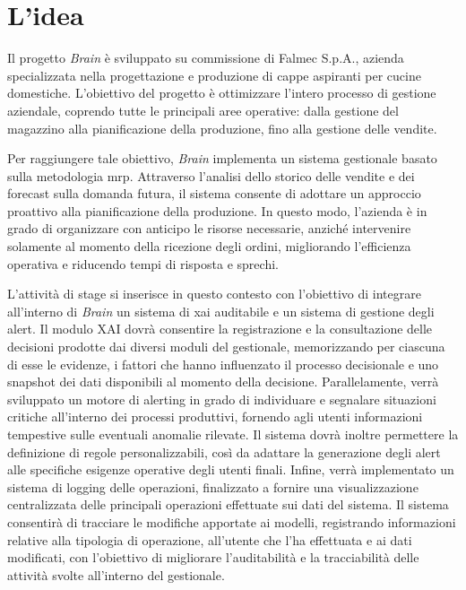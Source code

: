 \section{L'idea}
Il progetto \textit{Brain} è sviluppato su commissione di Falmec S.p.A., azienda 
specializzata nella progettazione e produzione di cappe aspiranti per cucine domestiche. 
L'obiettivo del progetto è ottimizzare l'intero processo di gestione aziendale, coprendo 
tutte le principali aree operative: dalla gestione del magazzino alla pianificazione della 
produzione, fino alla gestione delle vendite.

Per raggiungere tale obiettivo, \textit{Brain} implementa un sistema gestionale basato sulla 
metodologia \acrfull{mrp}. Attraverso l'analisi dello storico 
delle vendite e dei \gls{forecast} sulla domanda futura, il sistema 
consente di adottare un approccio proattivo alla pianificazione della produzione. In questo 
modo, l'azienda è in grado di organizzare con anticipo le risorse necessarie, anziché 
intervenire solamente al momento della ricezione degli ordini, migliorando l'efficienza 
operativa e riducendo tempi di risposta e sprechi.

L'attività di stage si inserisce in questo contesto con l'obiettivo di integrare all'interno di \textit{Brain} un sistema di \acrfull{xai} auditabile e un sistema di gestione 
degli alert.
\newline
Il modulo XAI dovrà consentire la registrazione e la consultazione delle decisioni prodotte dai diversi moduli del gestionale, memorizzando per ciascuna di esse le evidenze, 
i fattori che hanno influenzato il processo decisionale e uno \gls{snapshot} dei dati disponibili al momento della decisione.
\newline
Parallelamente, verrà sviluppato un motore di alerting in grado di individuare e segnalare situazioni critiche all'interno dei processi produttivi, fornendo agli utenti 
informazioni tempestive sulle eventuali anomalie rilevate. Il sistema dovrà inoltre permettere la definizione di regole personalizzabili, così da adattare la generazione degli
alert alle specifiche esigenze operative degli utenti finali.
\newline 
Infine, verrà implementato un sistema di logging delle operazioni, finalizzato a fornire una visualizzazione centralizzata delle principali operazioni effettuate sui dati 
del sistema. Il sistema consentirà di tracciare le modifiche apportate ai modelli, registrando informazioni relative alla tipologia di operazione, all'utente che l'ha effettuata 
e ai dati modificati, con l'obiettivo di migliorare l'auditabilità e la tracciabilità delle attività svolte all'interno del gestionale.


